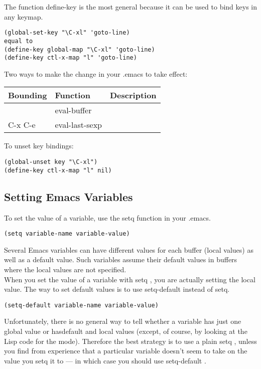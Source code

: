 \documentclass[11pt]{article}
\begin{document}
The function define-key is the most general because it can be used to bind keys in any keymap. \\

\begin{verbatim}
(global-set-key "\C-xl" 'goto-line)
equal to
(define-key global-map "\C-xl" 'goto-line)
(define-key ctl-x-map "l" 'goto-line)
\end{verbatim}

Two ways to make the change in your .emacs to take effect: \\
\begin{center}
\begin{tabular}{lll}
Bounding & Function & Description\\
\hline
 & eval-buffer & \\
C-x C-e & eval-last-sexp & \\
\end{tabular}
\end{center}


To unset key bindings: \\
\begin{verbatim}
(global-unset key "\C-xl")
(define-key ctl-x-map "l" nil)
\end{verbatim}

\subsection{Setting Emacs Variables}
\label{sec-1-4}
To set the value of a variable, use the setq function in your .emacs. \\
\begin{verbatim}
(setq variable-name variable-value)
\end{verbatim}


Several Emacs variables can have different values for each buffer (local values) as well as a default value. Such variables assume their default values in buffers where the local values are not specified. \\

When you set the value of a variable with setq , you are actually setting the local value. The way to set default values is to use setq-default instead of setq. \\
\begin{verbatim}
(setq-default variable-name variable-value)
\end{verbatim}


Unfortunately, there is no general way to tell whether a variable has just one global value or hasdefault and local values (except, of course, by looking at the Lisp code for the mode). Therefore the best strategy is to use a plain setq , unless you find from experience that a particular variable doesn't seem to take on the value you setq it to — in which case you should use setq-default . \\
\end{document}
